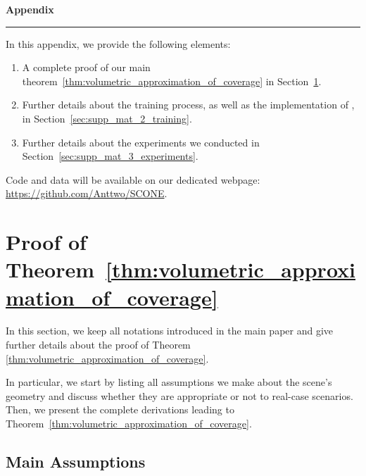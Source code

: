 \newpage
\appendix

{\LARGE 
\begin{center}
    \textbf{Appendix}
\end{center} 
\hrule
\vspace{3mm}}

In this appendix, we provide the following elements:
%
\begin{enumerate}
    \item A complete proof of our main theorem~\ref{thm:volumetric_approximation_of_coverage} in Section~\ref{sec:supp_mat_1_proof}.
    \item Further details about the training process, as well as the implementation of \method, in Section~\ref{sec:supp_mat_2_training}.
    \item Further details about the experiments we conducted in Section~\ref{sec:supp_mat_3_experiments}.
\end{enumerate}
%
Code and data will be available on our dedicated webpage: \url{https://github.com/Anttwo/SCONE}.

\section{Proof of Theorem~\ref{thm:volumetric_approximation_of_coverage}}
\label{sec:supp_mat_1_proof}

In this section, we keep all notations introduced in the main paper and give further details about the proof of Theorem \ref{thm:volumetric_approximation_of_coverage}.

In particular, we start by listing all assumptions we make about the scene's geometry and discuss whether they are appropriate or not to real-case scenarios. Then, we present the complete derivations leading to Theorem~\ref{thm:volumetric_approximation_of_coverage}.

\subsection{Main Assumptions}



